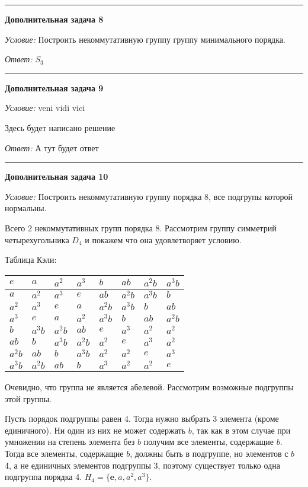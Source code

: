 \documentclass[12pt,a4paper]{article}
\newcommand{\sbs}{\large \bfseries}
\newcommand{\rl}{\vspace{16pt} \hrule \vspace{8pt}}
\begin{document}
\rl
{\sbs Дополнительная задача 8}

{\itshape Условие: } Построить некоммутативную группу группу минимального порядка.



{\itshape Ответ: } $S_3$




\rl
{\sbs Дополнительная задача 9}

{\itshape Условие: } veni vidi vici

Здесь будет написано решение

{\itshape Ответ: } А тут будет ответ




\rl
{\sbs Дополнительная задача 10}

{\itshape Условие: } Построить некоммутативную группу порядка 8, все подгрупы которой нормальны.

Всего 2 некоммутативных групп порядка 8. Рассмотрим группу симметрий четырехугольника $D_4$ и покажем что она удовлетворяет условию.\null

Таблица Кэли:

\begin{center}
\begin{tabular}{|l|l|l|l||l|l|l|l|}
\hline
$e$ & $a$ & $a^2$ & $a^3$ & $b$ & $ab$ & $a^2b$ & $a^3b$\\
\hline
$a$ & $a^2$ & $a^3$ & $e$ & $ab$ & $a^2b$ & $a^3b$ & $b$\\
\hline
$a^2$ & $a^3$ & $e$ & $a$ & $a^2b$ & $a^3b$ & $b$ & $ab$\\
\hline
$a^3$ & $e$ & $a$ & $a^2$ & $a^3b$ & $b$ & $ab$ & $a^2b$\\
\hline
\hline
$b$ & $a^3b$ & $a^2b$ & $ab$ & $e$ & $a^3$ & $a^2$ & $a^2$\\
\hline
$ab$ & $b$ & $a^3b$ & $a^2b$ & $a^2$ & $e$ & $a^3$ & $a^2$\\
\hline
$a^2b$ & $ab$ & $b$ & $a^3b$ & $a^2$ & $a^2$ & $e$ & $a^3$\\
\hline
$a^3b$ & $a^2b$ & $ab$ & $b$ & $a^3$ & $a^2$ & $a^2$ & $e$\\
\hline
\end{tabular}
\end{center}

Очевидно, что группа не является абелевой. Рассмотрим возможные подгруппы этой группы.\null

Пусть порядок подгруппы равен 4. Тогда нужно выбрать 3 элемента (кроме единичного). Ни один из них не может содержать $b$, так как в этом случае при умножении на степень элемента без $b$ получим все элементы, содержащие $b$. Тогда все элементы, содержащие $b$, должны быть в подгруппе, но элементов с $b$ 4, а не единичных элементов подгруппы 3, поэтому существует только одна подгруппа порядка 4. $H_4 = \{\boldsymbol{e}, a, a^2, a^3\}$.\null
\end{document}
